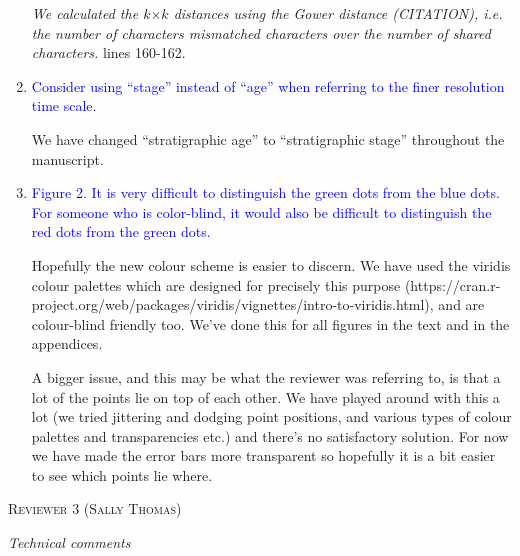 \documentclass[12pt,letterpaper]{article}
\renewcommand{\section}[1]{%
\bigskip
\begin{center}
\begin{Large}
\normalfont\scshape #1
\medskip
\end{Large}
\end{center}}
\renewcommand{\subsection}[1]{%
\bigskip
\begin{center}
\begin{large}
\normalfont\itshape #1
\end{large}
\end{center}}
\begin{document}
\begin{enumerate}
\textit{We calculated the $k$$\times$$k$ distances using the Gower distance (CITATION), i.e. the number of characters mismatched characters over the number of shared characters.} lines 160-162.

\item{\textcolor{blue}{Consider using ``stage'' instead of ``age'' when referring to the finer resolution time scale.}}

We have changed ``stratigraphic age'' to ``stratigraphic stage'' throughout the manuscript.

\item{\textcolor{blue}{Figure 2. It is very difficult to distinguish the green dots from the blue dots. For someone who is color-blind, it would also be difficult to distinguish the red dots from the green dots.}}

Hopefully the new colour scheme is easier to discern.
We have used the viridis colour palettes which are designed for precisely this purpose (https://cran.r-project.org/web/packages/viridis/vignettes/intro-to-viridis.html), and are colour-blind friendly too. We've done this for all figures in the text and in the appendices.

A bigger issue, and this may be what the reviewer was referring to, is that a lot of the points lie on top of each other. We have played around with this a lot (we tried jittering and dodging point positions, and various types of colour palettes and transparencies etc.) and there's no satisfactory solution. For now we have made the error bars more transparent so hopefully it is a bit easier to see which points lie where.


\end{enumerate}


%
%

\section{Reviewer 3 (Sally Thomas)}
\subsection{Technical comments}
\end{document}
